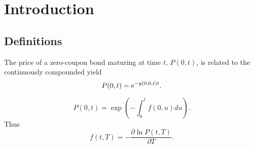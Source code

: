 \chapter{Introduction}

\section{Definitions}

The price of a zero-coupon bond maturing at time $t$, $P(0,t)$, is related to the continuously compounded yield
\begin{equation}
P(0,t) = \text{e}^{-y(0,0,t) t}.
\end{equation}

\begin{equation}
P(0,t) = \exp \left( -\int_0^t f(0,u) du \right).
\end{equation}
Thus
\begin{equation}
f(t,T) = - \frac{\partial \ln P(t,T)}{\partial T}.
\end{equation}
